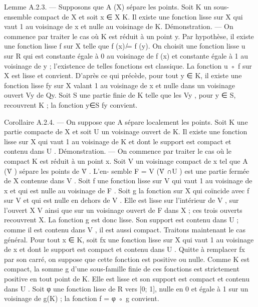 \documentclass[
  10pt,
]{article}
\newenvironment{Shaded}{}{}
\newcommand{\NormalTok}[1]{#1}
\begin{document}
\begin{Shaded}
\begin{Highlighting}[]
\NormalTok{Lemme A.2.3. — Supposons que A (X) sépare les points. Soit K un sous{-}ensemble}
\NormalTok{compact de X et soit x ∈ X K. Il existe une fonction lisse sur X qui vaut 1 au voisinage}
\NormalTok{de x et nulle au voisinage de K.}
\NormalTok{Démonstration. — On commence par traiter le cas où K est réduit à un point y. Par}
\NormalTok{hypothèse, il existe une fonction lisse f sur X telle que f (x) ̸= f (y). On choisit une}
\NormalTok{fonction lisse u sur R qui est constante égale à 0 au voisinage de f (x) et constante égale}
\NormalTok{à 1 au voisinage de y ; l’existence de telles fonctions est classique. La fonction u ◦ f sur X}
\NormalTok{est lisse et convient.}
\NormalTok{   D’après ce qui précède, pour tout y ∈ K, il existe une fonction lisse fy sur X valant 1}
\NormalTok{au voisinage de x et nulle dans un voisinage ouvert Vy de    Qy. Soit S une partie finie de K}
\NormalTok{telle que les Vy , pour y ∈ S, recouvrent K ; la fonction y∈S fy convient.}

\NormalTok{Corollaire A.2.4. — On suppose que A sépare localement les points. Soit K une}
\NormalTok{partie compacte de X et soit U un voisinage ouvert de K. Il existe une fonction lisse}
\NormalTok{sur X qui vaut 1 au voisinage de K et dont le support est compact et contenu dans U .}
\NormalTok{Démonstration. — On commence par traiter le cas où le compact K est réduit à un}
\NormalTok{point x. Soit V un voisinage compact de x tel que A (V̊ ) sépare les points de V̊ . L’en{-}}
\NormalTok{semble F = V (V̊ ∩U ) est une partie fermée de X contenue dans V . Soit f une fonction}
\NormalTok{lisse sur V qui vaut 1 au voisinage de x et qui est nulle au voisinage de F . Soit g la}
\NormalTok{fonction sur X qui coïncide avec f sur V et qui est nulle en dehors de V . Elle est lisse}
\NormalTok{sur l’intérieur de V , sur l’ouvert X V ainsi que sur un voisinage ouvert de F dans X ;}
\NormalTok{ces trois ouverts recouvrent X. La fonction g est donc lisse. Son support est contenu}
\NormalTok{dans U ; comme il est contenu dans V , il est aussi compact.}
\NormalTok{   Traitons maintenant le cas général. Pour tout x ∈ K, soit fx une fonction lisse sur X}
\NormalTok{qui vaut 1 au voisinage de x et dont le support est compact et contenu dans U . Quitte à}
\NormalTok{remplacer fx par son carré, on suppose que cette fonction est positive ou nulle. Comme K}
\NormalTok{est compact, la somme g d’une sous{-}famille finie de ces fonctions est strictement positive}
\NormalTok{en tout point de K. Elle est lisse et son support est compact et contenu dans U . Soit φ}
\NormalTok{une fonction lisse de R vers [0; 1], nulle en 0 et égale à 1 sur un voisinage de g(K) ; la}
\NormalTok{fonction f = φ ◦ g convient.}


\end{Highlighting}
\end{Shaded}
\end{document}
